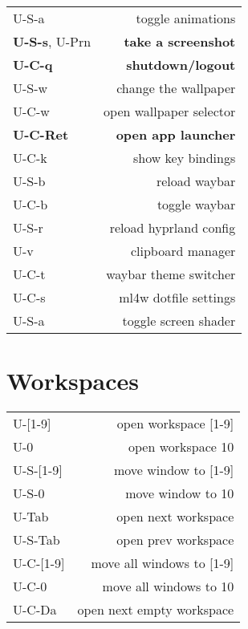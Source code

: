 \documentclass[
  ,landscape
  ,columns=4
]{cheatsheet}
\begin{document}
\begin{tabular}{lr}
  U-S-a & toggle animations \\
  \textbf{U-S-s}, U-Prn & \textbf{take a screenshot} \\
    \textbf{U-C-q} & \textbf{shutdown/logout} \\
  U-S-w & change the wallpaper \\
  U-C-w & open wallpaper selector \\
  \textbf{U-C-Ret} & \textbf{open app launcher} \\
  U-C-k & show key bindings \\
  U-S-b & reload waybar \\
  U-C-b & toggle waybar \\
  U-S-r & reload hyprland config \\
  U-v & clipboard manager \\
  U-C-t & waybar theme switcher \\
  U-C-s & ml4w dotfile settings \\
  U-S-a & toggle screen shader \\

\end{tabular}

\section{Workspaces}

\begin{tabular}{lr}
  U-[1-9] & open workspace [1-9] \\
  U-0 & open workspace 10 \\
  U-S-[1-9] & move window to [1-9] \\
  U-S-0 & move window to 10 \\
  U-Tab & open next workspace \\
  U-S-Tab & open prev workspace \\
  U-C-[1-9] & move all windows to [1-9] \\
  U-C-0 & move all windows to 10 \\
  U-C-Da & open next empty workspace \\
\end{tabular}
\end{document}
